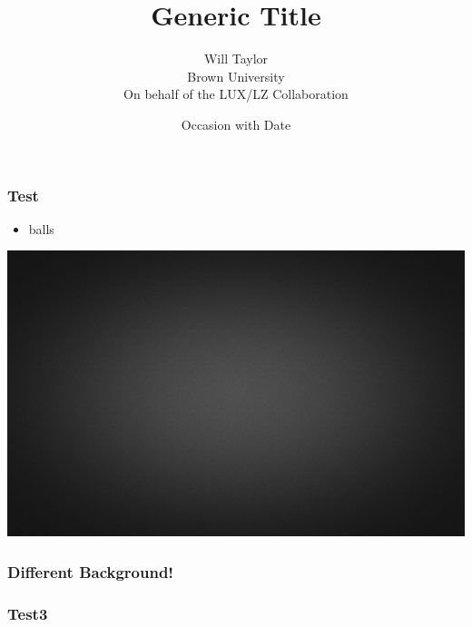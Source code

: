 \documentclass{beamer}
\title{Generic Title}
\date{Occasion with Date}
\author{Will Taylor \\
        Brown University \\
        On behalf of the LUX/LZ Collaboration}
\begin{document}
\begin{frame}
\titlepage
\end{frame}

\begin{frame}
    \frametitle{Test}
    \begin{itemize}
        \item{balls}
    \end{itemize}
\end{frame}

{
{\includegraphics{images/simple_gray.jpg}}

\begin{frame}
    \frametitle{Different Background!}
\end{frame}
}

\begin{frame}
\frametitle{Test3}
\end{frame}
\end{document}
